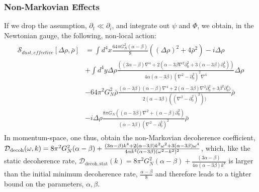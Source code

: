 \documentclass[aps,preprintnumbers,superscriptaddress,longbibliography]{revtex4-1}
\begin{document}
\subsubsection{Non-Markovian Effects}
If we drop the assumption, $\partial_t \ll \partial_i$, and integrate out $\psi$ and $\Phi$, we obtain, in the Newtonian gauge, the following, non-local action:
\begin{align}
\begin{split}
    \mathcal{S}_{dust,effective}[\Delta\rho,\bar\rho]&=\int d^4x\frac{64\pi G_N^2(\alpha-\beta)}{8}((\Delta\rho)^2+4\bar{\rho}^2)-i\Delta\rho \\&+\int d^4y\Delta\rho\frac{((3\alpha-\beta)\nabla^4+2(\alpha-3\beta\nabla^2\partial_0^2+3(\alpha-3\beta)\partial_0^4))}{4\alpha(\alpha-3\beta)(\nabla^2-\partial_0^2)^2\nabla^4}\Delta\rho\\&-64\pi^2 G_N^2\bar\rho\frac{(\alpha-3\beta)(\alpha-\beta) \nabla^4+2(\alpha-3\beta)\nabla^2\partial_0^2+3\beta^2\partial_0^4)}{2(\alpha-3\beta)((\nabla^2-\partial_0^2)^2))}\bar\rho\\&-i\Delta\rho\frac{8\pi G_N((\alpha-3\beta)\nabla^2+(\alpha-\beta)\partial_0^2)}{(\alpha-3\beta)(\nabla^2-\partial_0^2)^2}\bar\rho 
\end{split}
\end{align}
In momentum-space, one thus, obtain the non-Markovian decoherence coefficient, 
$
\mathcal{D}_{\mathrm{decoh}}(\omega,k) = 8\pi^2 G_N^2(\alpha-\beta)\\+\frac{(3\alpha-\beta)k^4+2(\alpha-3\beta)k^2\omega^2+3(\alpha-3\beta)\omega^4}{4\alpha k^4(\alpha-3\beta)(\omega^2-k^2)^2}$, which,  like the static decoherence rate, 
$\mathcal{D}_{\mathrm{decoh,stat}}(k)=8\pi^2 G_N^2(\alpha-\beta)+\frac{(3\alpha-\beta)}{4\alpha(\alpha-3\beta)k^4}$ is larger than the initial minimum decoherence rate, $\frac{\alpha-\beta}{8}$ and therefore leads to a tighter bound on the parameters, $\alpha,\beta$.
\end{document}
